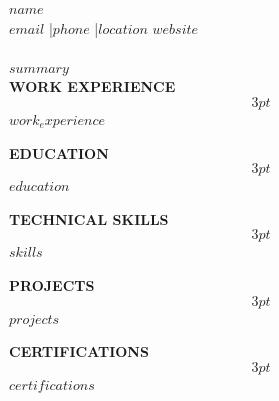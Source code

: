 \documentclass[10pt]{article}
\newcommand{\SectionTitle}[1]{{\Large\textbf{\textcolor{accentblue}{#1}}}\\\[3pt\]}
\begin{document}
{\fontsize{24pt}{26pt}\selectfont\textbf{$name$}} \\[2pt]
{\small $email$ \quad|\quad $phone$ \quad|\quad $location$ \quad $website$} \\[12pt]
\hrulefill \\[8pt]

$summary$ \\[12pt]

\SectionTitle{WORK EXPERIENCE}
$work_experience$

\SectionTitle{EDUCATION}
$education$

\SectionTitle{TECHNICAL SKILLS}
$skills$

\SectionTitle{PROJECTS}
$projects$

\SectionTitle{CERTIFICATIONS}
$certifications$
\end{document}
